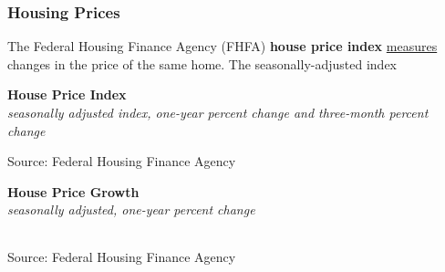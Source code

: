 \documentclass{report}
\makeatletter
\newcommand{\tbllink}[1]{\href{https://raw.githubusercontent.com/bdecon/US-chartbook/master/chartbook/data/#1}{\faTable}}
\newcommand*\short[1]{\expandafter\@gobbletwo\number\numexpr#1\relax}
\newcommand{\dateaxisticks}{
		date coordinates in=x, axis line style={draw=none},
		xmax={2023-10-01},
		max space between ticks=40,	    
		xtick={{1990-01-01}, {1992-01-01}, {1994-01-01}, 
			{1996-01-01}, {1998-01-01}, {2000-01-01}, 
			{2002-01-01}, {2004-01-01}, {2006-01-01},
			{2008-01-01}, {2010-01-01}, {2012-01-01}, {2014-01-01},
		    {2016-01-01}, {2018-01-01}, {2020-01-01}, {2022-01-01}, 
		    {2024-01-01}, {2026-01-01}},
		minor xtick={{1989-01-01}, {1991-01-01}, {1993-01-01},
			{1995-01-01}, {1997-01-01}, {1999-01-01}, 
			{2001-01-01}, {2003-01-01}, {2005-01-01}, {2007-01-01},
		    {2009-01-01}, {2011-01-01}, {2013-01-01}, {2015-01-01},
		    {2017-01-01}, {2019-01-01}, {2021-01-01}, {2023-01-01}, 
		    {2025-01-01}, {2027-01-01}},
		enlarge y limits={0.06}, enlarge x limits={0.01},
		}
\newcommand{\bbar}[2]{extra #1 ticks = {{#2}}, extra #1 tick labels = ,
		extra #1 tick style = {grid=major, grid style={thick, black!25}},}
\newcommand{\stdline}[4]{\addplot[very thick, no markers, color=#1] 
		table [x=#2, y=#3, col sep=comma] {#4};	}
\newcommand{\thickline}[4]{\addplot[ultra thick, no markers, color=#1] 
		table [x=#2, y=#3, col sep=comma] {#4};	}
\newcommand{\rebars}{
		\fill[color=black!10] (axis cs:{2007-12-01},\pgfkeysvalueof{/pgfplots/ymin}) rectangle 
			(axis cs:{2009-07-01}, \pgfkeysvalueof{/pgfplots/ymax});
		\fill[color=black!10] (axis cs:{2001-03-01},\pgfkeysvalueof{/pgfplots/ymin}) rectangle 
			(axis cs:{2001-11-01}, \pgfkeysvalueof{/pgfplots/ymax});
		\fill[color=black!10] (axis cs:{2020-02-01},\pgfkeysvalueof{/pgfplots/ymin}) rectangle 
			(axis cs:{2020-05-01}, \pgfkeysvalueof{/pgfplots/ymax});}
\makeatother
\begin{document}
{\subsubsection*{Housing Prices}   
\begin{minipage}{0.76\textwidth}
\small The Federal Housing Finance Agency (FHFA) \textbf{house price index} \href{https://www.fhfa.gov/DataTools/Downloads/Pages/House-Price-Index-Datasets.aspx}{measures} changes in the price of the same home. The seasonally-adjusted index 

\normalsize \textbf{House Price Index}\\
\footnotesize{\textit{seasonally adjusted index, one-year percent change and three-month percent change}}
\vspace{3.4cm}

\hspace{4mm} 

\footnotesize{Source: Federal Housing Finance Agency} \hfill \tbllink{hpi.csv}
\vspace{1mm}

\normalsize{\textbf{House Price Growth}}\\
\footnotesize{\textit{seasonally adjusted, one-year percent change}}\\
\hspace*{-3mm} \noindent {} \setlength{\tabcolsep}{2.1pt} \color{black!90}
		{\renewcommand{\arraystretch}{1.45}
		 \begin{tabular}{p{25mm} R{8mm} R{8mm} R{8mm} R{8mm} R{8mm} R{8mm} R{8mm} R{12.0mm} R{10.8mm}}
			  \hline
		\end{tabular}}
		
	\vspace{-2mm}
\footnotesize{Source: Federal Housing Finance Agency} \hfill \tbllink{hpi.csv}
\end{minipage}
\vspace{3mm}

}
\end{document}
